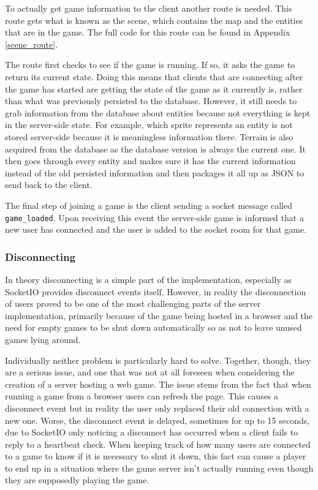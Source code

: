To actually get game information to the client another route is needed. This route gets what is known as the scene, which contains the map and the entities that are in the game. The full code for this route can be found in Appendix \ref{scene_route}.

The route first checks to see if the game is running. If so, it asks the game to return its current state. Doing this means that clients that are connecting after the game has started are getting the state of the game as it currently is, rather than what was previously persisted to the database. However, it still needs to grab information from the database about entities because not everything is kept in the server-side state. For example, which sprite represents an entity is not stored server-side because it is meaningless information there. Terrain is also acquired from the database as the database version is always the current one. It then goes through every entity and makes sure it has the current information instead of the old persisted information and then packages it all up as JSON to send back to the client.

The final step of joining a game is the client sending a socket message called \texttt{game\_loaded}. Upon receiving this event the server-side game is informed that a new user has connected and the user is added to the socket room for that game.

\subsubsection{Disconnecting}\label{disconnecting}
In theory disconnecting is a simple part of the implementation, especially as SocketIO provides disconnect events itself. However, in reality the disconnection of users proved to be one of the most challenging parts of the server implementation, primarily because of the game being hosted in a browser and the need for empty games to be shut down automatically so as not to leave unused games lying around.

Individually neither problem is particularly hard to solve. Together, though, they are a serious issue, and one that was not at all foreseen when considering the creation of a server hosting a web game. The issue stems from the fact that when running a game from a browser users can refresh the page. This causes a disconnect event but in reality the user only replaced their old connection with a new one. Worse, the disconnect event is delayed, sometimes for up to 15 seconds, due to SocketIO only noticing a disconnect has occurred when a client fails to reply to a heartbeat check. When keeping track of how many users are connected to a game to know if it is necessary to shut it down, this fact can cause a player to end up in a situation where the game server isn't actually running even though they are supposedly playing the game.

